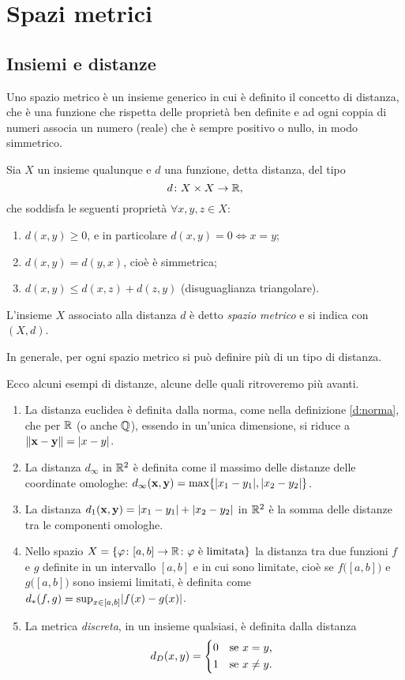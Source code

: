 \chapter{Spazi metrici}
\section{Insiemi e distanze}
Uno spazio metrico è un insieme generico in cui è definito il concetto di distanza, che è una funzione che rispetta delle proprietà ben definite e ad ogni coppia di numeri associa un numero (reale) che è sempre positivo o nullo, in modo simmetrico.
\begin{definizione}
Sia $X$ un insieme qualunque e $d$ una funzione, detta distanza, del tipo
\[
d\colon X\times X\to\mathbb{R},
\]
che soddisfa le seguenti proprietà $\forall x,y,z\in X$:
\begin{enumerate}
\item $d(x,y)\geq 0$, e in particolare $d(x,y)=0\iff x=y$;
\item $d(x,y)=d(y,x)$, cioè è simmetrica;
\item $d(x,y)\leq d(x,z)+d(z,y)$ (disuguaglianza triangolare).
\end{enumerate}
L'insieme $X$ associato alla distanza $d$ è detto \emph{spazio metrico} e si indica con $(X,d)$.
\end{definizione}
In generale, per ogni spazio metrico si può definire più di un tipo di distanza.
\begin{esempio} \label{es:distanze}
	Ecco alcuni esempi di distanze, alcune delle quali ritroveremo più avanti.
	\begin{enumerate}
		\item La distanza euclidea è definita dalla norma, come nella definizione \ref{d:norma}, che per $\mathbb{R}$ (o anche $\mathbb{Q}$), essendo in un'unica dimensione, si riduce a $\lVert\mathbf{x}-\mathbf{y}\rVert=\lvert x-y\rvert$.
		\item La distanza $d_\infty$ in $\mathbb{R}^2$ è definita come il massimo delle distanze delle coordinate omologhe: $d_\infty(\mathbf{x},\mathbf{y})=\max\{\lvert x_1-y_1\rvert,\lvert x_2-y_2\rvert\}$.
		\item La distanza $d_1(\mathbf{x},\mathbf{y})=\lvert x_1-y_1\rvert+\lvert x_2-y_2\rvert$ in $\mathbb{R}^2$ è la somma delle distanze tra le componenti omologhe.
		\item Nello spazio $X=\{\varphi\colon[a,b]\to\mathbb{R}\colon\varphi\text{ è limitata}\}$ la distanza tra due funzioni $f$ e $g$ definite in un intervallo $[a,b]$ e in cui sono limitate, cioè se $f\big([a,b]\big)$ e $g\big([a,b]\big)$ sono insiemi limitati, è definita come $d_*(f,g)=\sup_{x\in[a,b]}\lvert f(x)-g(x)\rvert$.
		\item La metrica \emph{discreta}, in un insieme qualsiasi, è definita dalla distanza
			\[
				d_D(x,y)=
				\begin{cases*}
					0 &se $x=y$,\\
					1 &se $x\neq y$.
				\end{cases*}
			\]
	\end{enumerate}
\end{esempio}
